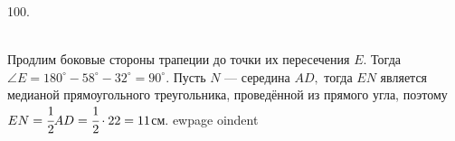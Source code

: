 100. \begin{figure}[ht!]
\end{figure}\\
Продлим боковые стороны трапеции до точки их пересечения $E.$ Тогда $\angle E=180^\circ-58^\circ-32^\circ=90^\circ.$ Пусть $N$ --- середина $AD,$ тогда $EN$ является медианой прямоугольного треугольника, проведённой из прямого угла, поэтому $EN=\cfrac{1}{2}AD=\cfrac{1}{2}\cdot22=11$см.
ewpage
oindent

